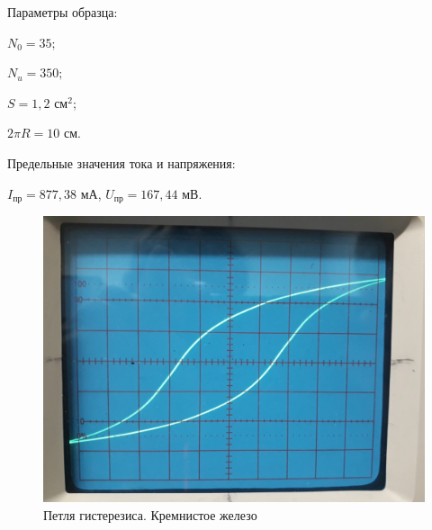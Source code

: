 \documentclass[a4paper,12pt]{article} %
\begin{document}
Параметры образца:

$N_0 = 35;$

$N_u = 350;$

$S = 1,2$ см$^2$;

$2\pi R = 10$ см.

\vspace{7mm}
Предельные значения тока и напряжения:

$I_{\text{пр}} = 877,38$ мА, $U_{\text{пр}} = 167,44$ мВ.
\newpage
\begin{figure}[h!]
	\centering
	\includegraphics[scale=0.18]{Pictures/КРМЖЛЗ_ПЕТЛЯ.jpg}
	\caption{Петля гистерезиса. Кремнистое железо}
\end{figure}
\end{document}
